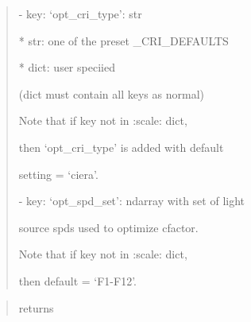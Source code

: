 \documentclass[letterpaper,10pt,english]{sphinxmanual}
\begin{document}
\begin{fulllineitems}
\begin{description}
\begin{quote}
\begin{description}
\begin{DUlineblock}{0em}
\begin{DUlineblock}{\DUlineblockindent}
\begin{DUlineblock}{\DUlineblockindent}
\begin{DUlineblock}{\DUlineblockindent}
\begin{DUlineblock}{\DUlineblockindent}
\begin{DUlineblock}{\DUlineblockindent}
\begin{DUlineblock}{\DUlineblockindent}
\item[] 
\end{DUlineblock}
\item[] - key: ‘opt\_cri\_type’:  str 
\item[]
\begin{DUlineblock}{\DUlineblockindent}
\item[]
\begin{DUlineblock}{\DUlineblockindent}
\item[] * str: one of the preset \_CRI\_DEFAULTS
\item[] * dict: user speciied 
\item[] (dict must contain all keys as normal)
\end{DUlineblock}
\item[] Note that if key not in :scale: dict, 
\item[] then ‘opt\_cri\_type’ is added with default 
\item[] setting = ‘ciera’.
\end{DUlineblock}
\end{DUlineblock}
\item[] - key: ‘opt\_spd\_set’: ndarray with set of light 
\item[]
\begin{DUlineblock}{\DUlineblockindent}
\item[] source spds used to optimize cfactor. 
\item[] Note that if key not in :scale: dict, 
\item[] then default = ‘F1-F12’.
\end{DUlineblock}
\end{DUlineblock}
\end{DUlineblock}
\end{DUlineblock}
\end{DUlineblock}
\end{DUlineblock}

\end{description}\end{quote}

\item[{Returns:}] \leavevmode\begin{quote}\begin{description}
\item[{returns}] \leavevmode
{}


\end{description}
\end{quote}
\end{description}
\end{fulllineitems}
\end{document}
